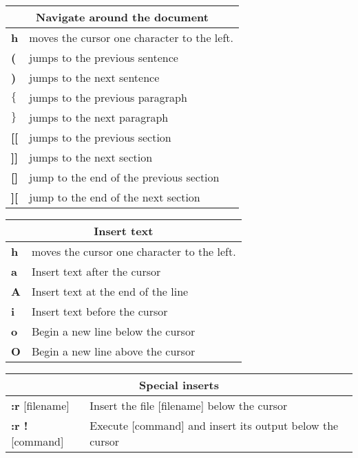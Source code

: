 \begin{table}[h]
\centering
\footnotesize
\begin{tabular}{|l|l|}
\multicolumn{2}{c}{\textbf{Navigate around the document}}\\
\hline
\textbf{h}	& {moves the cursor one character to the left.}\\
\hline
\textbf{(}	& {jumps to the previous sentence}\\
\hline
\textbf{)}	& {jumps to the next sentence}\\
\hline
\textbf{$\lbrace$ }	& {jumps to the previous paragraph}\\
\hline
\textbf{$\rbrace$}	& {jumps to the next paragraph}\\
\hline
\textbf{[[}	& {jumps to the previous section}\\
\hline
\textbf{]]}	& {jumps to the next section}\\
\hline
\textbf{[]}	& {jump to the end of the previous section}\\
\hline
\textbf{][}	& {jump to the end of the next section}\\
\hline
\end{tabular}
\end{table}

\begin{table}[h]
\centering
\footnotesize
\begin{tabular}{|l|l|}
\multicolumn{2}{c}{\textbf{Insert text}}\\
\hline
\textbf{h}	& {moves the cursor one character to the left.}\\
\hline
\textbf{a}	& {Insert text after the cursor}\\
\hline
\textbf{A}	& {Insert text at the end of the line}\\
\hline
\textbf{i}	& {Insert text before the cursor}\\
\hline
\textbf{o}	& {Begin a new line below the cursor}\\
\hline
\textbf{O}	& {Begin a new line above the cursor}\\
\hline
\end{tabular}
\end{table}

\begin{table}[h]
\centering
\footnotesize
\begin{tabular}{|l|l|}
\multicolumn{2}{c}{\textbf{Special inserts}}\\
\hline
{\textbf{:r} [filename]} & {Insert the file [filename] below the cursor}\\
\hline
{\textbf{:r !}[command]} & {Execute [command] and insert its output below the cursor}\\
\hline
\end{tabular}
\end{table}

